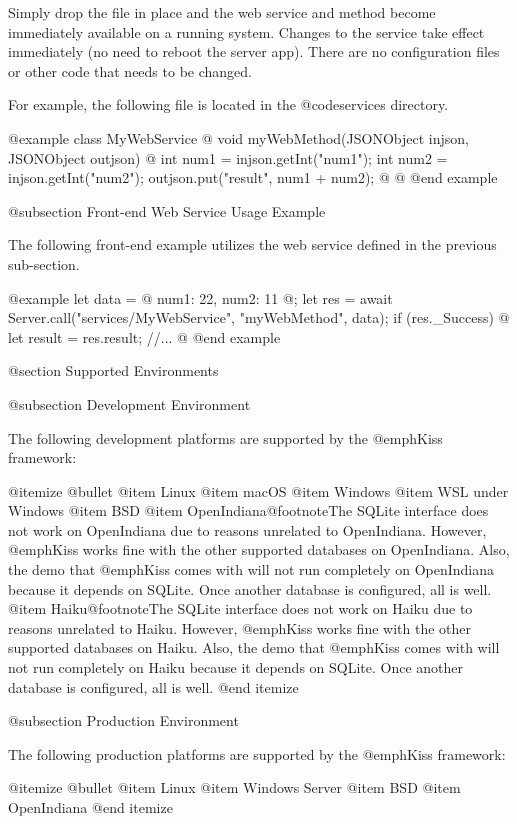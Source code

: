 Simply drop the file in place and the web service and method become
immediately available on a running system.  Changes to the service
take effect immediately (no need to reboot the server app).  There are
no configuration files or other code that needs to be changed.

For example, the following file is located in the
@code{services} directory.

@example
class MyWebService @{
    void myWebMethod(JSONObject injson, JSONObject outjson) @{
        int num1 = injson.getInt("num1");
        int num2 = injson.getInt("num2");
        outjson.put("result", num1 + num2);
    @}
@}
@end example

@subsection Front-end Web Service Usage Example

The following front-end example utilizes the web service defined in the
previous sub-section.

@example
let data = @{
    num1:  22,
    num2:  11
@};
let res = await Server.call("services/MyWebService", "myWebMethod", data);
if (res._Success) @{
    let result = res.result;
    //...
@}
@end example
    

@section Supported Environments

@subsection Development Environment

The following development platforms are supported by the @emph{Kiss}
framework:

@itemize @bullet
@item
Linux
@item
macOS
@item
Windows
@item
WSL under Windows
@item
BSD
@item
OpenIndiana@footnote{The SQLite interface does not work on OpenIndiana due to reasons unrelated to OpenIndiana.
However, @emph{Kiss} works fine with the other supported databases on OpenIndiana.  Also, the demo that @emph{Kiss} comes with will not
run completely on OpenIndiana because it depends on SQLite.  Once another database is configured, all is well.}
@item
Haiku@footnote{The SQLite interface does not work on Haiku due to reasons unrelated to Haiku.
However, @emph{Kiss} works fine with the other supported databases on Haiku.  Also, the demo that @emph{Kiss} comes with will not
run completely on Haiku because it depends on SQLite.  Once another database is configured, all is well.}
@end itemize

@subsection Production Environment


The following production platforms are supported by the @emph{Kiss}
framework:

@itemize @bullet
@item
Linux
@item
Windows Server
@item
BSD
@item
OpenIndiana
@end itemize



